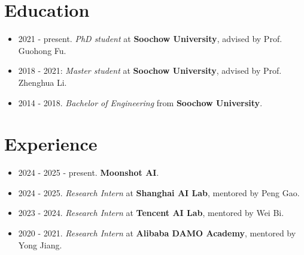 \documentclass[a4paper,12pt]{article}
\begin{document}
\section{Education}
\begin{itemize}[leftmargin=18pt]
      \item 2021 - present. \emph{PhD student} at \textbf{Soochow University}, advised by Prof. Guohong Fu.
      \item 2018 - 2021: \emph{Master student} at \textbf{Soochow University}, advised by Prof. Zhenghua Li.
      \item 2014 - 2018. \emph{Bachelor of Engineering} from \textbf{Soochow University}.
\end{itemize}

\section{Experience}
\begin{itemize}[leftmargin=18pt]
      \item 2024 - 2025 - present. \textbf{Moonshot AI}.
      \item 2024 - 2025. \emph{Research Intern} at \textbf{Shanghai AI Lab}, mentored by Peng Gao.
      \item 2023 - 2024. \emph{Research Intern} at \textbf{Tencent AI Lab}, mentored by Wei Bi.
      \item 2020 - 2021. \emph{Research Intern} at \textbf{Alibaba DAMO Academy}, mentored by Yong Jiang.
\end{itemize}
\end{document}
